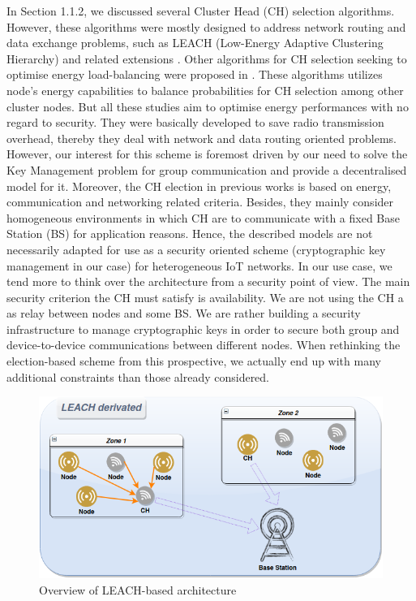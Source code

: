 In Section 1.1.2, we discussed several Cluster Head (CH) selection algorithms. However, these algorithms were mostly designed to address network routing and data exchange problems, such as LEACH (Low-Energy Adaptive Clustering Hierarchy) \cite{heinzelman_energy-efcient_2000} and related extensions \cite{al-baz_new_2018, kang_distance_2012}. Other algorithms for CH selection seeking to optimise energy load-balancing were  proposed in \cite{behera_residual_2019, jia_dynamic_2016}. These algorithms utilizes node’s energy capabilities to balance probabilities for CH selection among other cluster nodes. But all these studies aim to optimise energy performances with no regard to security. They were basically developed to save radio transmission overhead, thereby they deal with network and data routing oriented problems. However, our interest for this scheme is foremost driven by our need to solve the Key Management problem for group communication and provide a decentralised model for it. Moreover, the CH election in previous works is based on energy, communication and networking related criteria. Besides, they mainly consider homogeneous environments in which CH are to communicate with a fixed Base Station (BS) for application reasons. Hence, the described models are not necessarily adapted for use as a security oriented scheme (cryptographic key management in our case) for heterogeneous IoT networks. In our use case, we tend more to think over the architecture from a security point of view. The main security criterion the CH must satisfy is availability. We are not using the CH a as relay between nodes and some BS. We are rather building a security infrastructure to manage cryptographic keys in order to secure both group and device-to-device communications between different nodes. When rethinking the election-based scheme from this prospective, we actually end up with many additional constraints than those already considered.

\begin{figure}[htbp]
	\centerline{\includegraphics[scale=0.50]{figures/LEACH.png}}
	\caption{Overview of LEACH-based architecture}
	\label{fig}
\end{figure}

